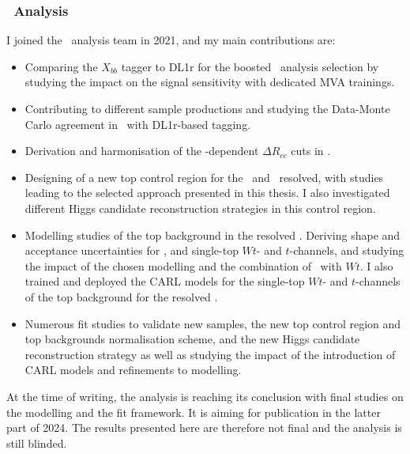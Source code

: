 \subsubsection{\boldvhbc\ Analysis}
I joined the \vhbc\ analysis team in 2021, and my main contributions are:
\begin{itemize}
    \item Comparing the $X_{bb}$ tagger to DL1r for the boosted \vhb\ analysis selection by studying the impact on the signal sensitivity with dedicated MVA trainings.
    \item Contributing to different sample productions and studying the Data-Monte Carlo agreement in \vhc\ with DL1r-based tagging. 
    \item Derivation and harmonisation of the \ptv-dependent $\Delta R_{cc}$ cuts in \vhc.
    \item Designing of a new top control region for the \vhc\ and \vhb\ resolved, with studies leading to the selected approach presented in this thesis. I also investigated different Higgs candidate reconstruction strategies in this control region.
    \item Modelling studies of the top background in the resolved \vhb. Deriving shape and acceptance uncertainties for \ttb, and single-top $Wt$- and $t$-channels, and studying the impact of the chosen modelling and the combination of \ttb\ with $Wt$. I also trained and deployed the CARL models for the single-top $Wt$- and $t$-channels of the top background for the resolved \vhb. 
    \item Numerous fit studies to validate new samples, the new top control region and top backgrounds normalisation scheme, and the new Higgs candidate reconstruction strategy as well as studying the impact of the introduction of CARL models and refinements to modelling.
\end{itemize}
At the time of writing, the analysis is reaching its conclusion with final studies on the modelling and the fit framework. It is aiming for publication in the latter part of 2024. The results presented here are therefore not final and the analysis is still blinded.